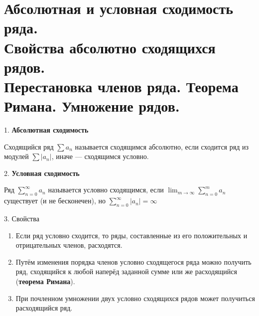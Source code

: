 \section{
    Абсолютная и условная сходимость ряда. \\
    Свойства абсолютно сходящихся рядов. \\
    Перестановка членов ряда. Теорема Римана. Умножение рядов. 
}

1. \textbf{Абсолютная сходимость}

Сходящийся ряд ${\displaystyle \sum a_{n}}$ называется сходящимся абсолютно, 
если сходится ряд из модулей ${\displaystyle \sum |a_{n}|}$, 
иначе — сходящимся условно.

2. \textbf{Условная сходимость}

Ряд ${\displaystyle \sum _{n=0}^{\infty }a_{n}}$ называется условно сходящимся, 
если ${\displaystyle \lim _{m\to \infty }\sum _{n=0}^{m}a_{n}}$ существует 
(и не бесконечен), но ${\displaystyle \sum _{n=0}^{\infty }|a_{n}|=\infty }$

3. Свойства
\begin{enumerate}
    \item Если ряд условно сходится, то ряды, 
    составленные из его положительных и отрицательных членов, расходятся.
    \item Путём изменения порядка членов условно сходящегося ряда можно получить ряд, 
    сходящийся к любой наперёд заданной сумме или же расходящийся (\textbf{теорема Римана}).
    \item При почленном умножении двух условно сходящихся рядов может 
    получиться расходящийся ряд.
\end{enumerate}

